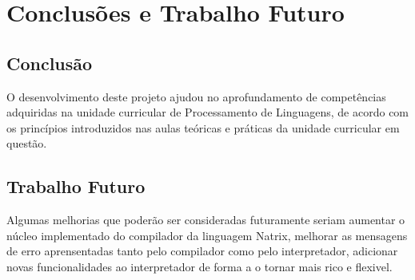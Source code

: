 \section{Conclusões e Trabalho Futuro}
\label{sec4:conc-trab-futuro}

\subsection{Conclusão}
\label{sec4:subsec:conc-princ}

O desenvolvimento deste projeto ajudou no aprofundamento de competências adquiridas na unidade curricular de Processamento de Linguagens, de acordo com os princípios introduzidos nas aulas teóricas e práticas da unidade curricular em questão.

\subsection{Trabalho Futuro}
\label{sec4:subsec:trab-futuro}

Algumas melhorias que poderão ser consideradas futuramente seriam aumentar o núcleo implementado do compilador da linguagem Natrix, melhorar as mensagens de erro aprensentadas tanto pelo compilador como pelo interpretador, adicionar novas funcionalidades ao interpretador de forma a o tornar mais rico e flexivel.
